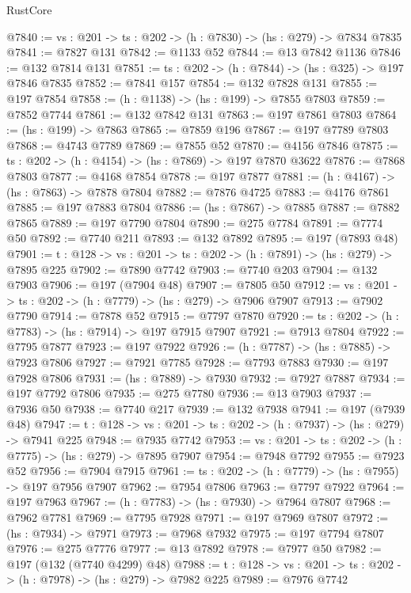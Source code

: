 \begin{lexlean}{RustCore}
\begin{coremodule}
@7840 := {vs : @201} -> {ts : @202} -> (h : @7830) -> (hs : @279) -> @7834 @7835
@7841 := @7827 @131
@7842 := @1133 @52
@7844 := @13 @7842 @1136
@7846 := @132 @7814 @131
@7851 := {ts : @202} -> (h : @7844) -> (hs : @325) -> @197 @7846 @7835
@7852 := @7841 @157
@7854 := @132 @7828 @131
@7855 := @197 @7854
@7858 := (h : @1138) -> (hs : @199) -> @7855 @7803
@7859 := @7852 @7744
@7861 := @132 @7842 @131
@7863 := @197 @7861 @7803
@7864 := (hs : @199) -> @7863
@7865 := @7859 @196
@7867 := @197 @7789 @7803
@7868 := @4743 @7789
@7869 := @7855 @52
@7870 := @4156 @7846
@7875 := {ts : @202} -> (h : @4154) -> (hs : @7869) -> @197 @7870 @3622
@7876 := @7868 @7803
@7877 := @4168 @7854
@7878 := @197 @7877
@7881 := (h : @4167) -> (hs : @7863) -> @7878 @7804
@7882 := @7876 @4725
@7883 := @4176 @7861
@7885 := @197 @7883 @7804
@7886 := (hs : @7867) -> @7885
@7887 := @7882 @7865
@7889 := @197 @7790 @7804
@7890 := @275 @7784
@7891 := @7774 @50
@7892 := @7740 @211
@7893 := @132 @7892
@7895 := @197 (@7893 @48)
@7901 := {t : @128} -> {vs : @201} -> {ts : @202} -> (h : @7891) -> (hs : @279) -> @7895 @225
@7902 := @7890 @7742
@7903 := @7740 @203
@7904 := @132 @7903
@7906 := @197 (@7904 @48)
@7907 := @7805 @50
@7912 := {vs : @201} -> {ts : @202} -> (h : @7779) -> (hs : @279) -> @7906 @7907
@7913 := @7902 @7790
@7914 := @7878 @52
@7915 := @7797 @7870
@7920 := {ts : @202} -> (h : @7783) -> (hs : @7914) -> @197 @7915 @7907
@7921 := @7913 @7804
@7922 := @7795 @7877
@7923 := @197 @7922
@7926 := (h : @7787) -> (hs : @7885) -> @7923 @7806
@7927 := @7921 @7785
@7928 := @7793 @7883
@7930 := @197 @7928 @7806
@7931 := (hs : @7889) -> @7930
@7932 := @7927 @7887
@7934 := @197 @7792 @7806
@7935 := @275 @7780
@7936 := @13 @7903
@7937 := @7936 @50
@7938 := @7740 @217
@7939 := @132 @7938
@7941 := @197 (@7939 @48)
@7947 := {t : @128} -> {vs : @201} -> {ts : @202} -> (h : @7937) -> (hs : @279) -> @7941 @225
@7948 := @7935 @7742
@7953 := {vs : @201} -> {ts : @202} -> (h : @7775) -> (hs : @279) -> @7895 @7907
@7954 := @7948 @7792
@7955 := @7923 @52
@7956 := @7904 @7915
@7961 := {ts : @202} -> (h : @7779) -> (hs : @7955) -> @197 @7956 @7907
@7962 := @7954 @7806
@7963 := @7797 @7922
@7964 := @197 @7963
@7967 := (h : @7783) -> (hs : @7930) -> @7964 @7807
@7968 := @7962 @7781
@7969 := @7795 @7928
@7971 := @197 @7969 @7807
@7972 := (hs : @7934) -> @7971
@7973 := @7968 @7932
@7975 := @197 @7794 @7807
@7976 := @275 @7776
@7977 := @13 @7892
@7978 := @7977 @50
@7982 := @197 (@132 (@7740 @4299) @48)
@7988 := {t : @128} -> {vs : @201} -> {ts : @202} -> (h : @7978) -> (hs : @279) -> @7982 @225
@7989 := @7976 @7742

\end{coremodule}
\end{lexlean}
